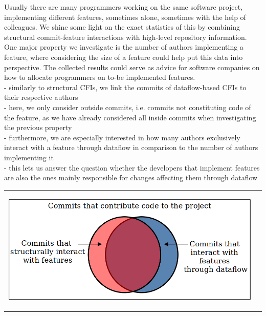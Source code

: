 Usually there are many programmers working on the same software project, implementing different features, sometimes alone, sometimes with the help of colleagues.
We shine some light on the exact statistics of this by combining structural commit-feature interactions with high-level repository information.
One major property we investigate is the number of authors implementing a feature, where considering the size of a feature could help put this data into perspective.
The collected results could serve as advice for software companies on how to allocate programmers on to-be implemented features. \\
- similarly to structural CFIs, we link the commits of dataflow-based CFIs to their respective authors \\
- here, we only consider outside commits, i.e. commits not constituting code of the feature, as we have already considered all inside commits when investigating the previous property \\
- furthermore, we are especially interested in how many authors exclusively interact with a feature through dataflow in comparison to the number of authors implementing it \\
- this lets us answer the question whether the developers that implement features are also the ones mainly responsible for changes affecting them through dataflow \\

\begin{center}
\begin{tabular}{cc}
\includegraphics[height=6cm]{gfx/Commits-of-a-Software-Project.png}
\end{tabular}
\end{center}

